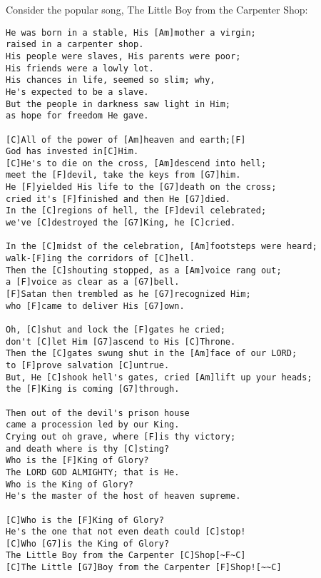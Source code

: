 Consider the popular song, The Little Boy from the Carpenter Shop:

\begin{verbatim}
He was born in a stable, His [Am]mother a virgin; 
raised in a carpenter shop.
His people were slaves, His parents were poor; 
His friends were a lowly lot.
His chances in life, seemed so slim; why, 
He's expected to be a slave.
But the people in darkness saw light in Him; 
as hope for freedom He gave.

[C]All of the power of [Am]heaven and earth;[F] 
God has invested in[C]Him.
[C]He's to die on the cross, [Am]descend into hell; 
meet the [F]devil, take the keys from [G7]him.
He [F]yielded His life to the [G7]death on the cross; 
cried it's [F]finished and then He [G7]died.
In the [C]regions of hell, the [F]devil celebrated; 
we've [C]destroyed the [G7]King, he [C]cried.

In the [C]midst of the celebration, [Am]footsteps were heard; 
walk-[F]ing the corridors of [C]hell.
Then the [C]shouting stopped, as a [Am]voice rang out; 
a [F]voice as clear as a [G7]bell.
[F]Satan then trembled as he [G7]recognized Him; 
who [F]came to deliver His [G7]own.

Oh, [C]shut and lock the [F]gates he cried; 
don't [C]let Him [G7]ascend to His [C]Throne.
Then the [C]gates swung shut in the [Am]face of our LORD; 
to [F]prove salvation [C]untrue.
But, He [C]shook hell's gates, cried [Am]lift up your heads; 
the [F]King is coming [G7]through.

Then out of the devil's prison house 
came a procession led by our King.
Crying out oh grave, where [F]is thy victory; 
and death where is thy [C]sting?
Who is the [F]King of Glory? 
The LORD GOD ALMIGHTY; that is He.
Who is the King of Glory? 
He's the master of the host of heaven supreme.

[C]Who is the [F]King of Glory? 
He's the one that not even death could [C]stop!
[C]Who [G7]is the King of Glory? 
The Little Boy from the Carpenter [C]Shop[~F~C]
[C]The Little [G7]Boy from the Carpenter [F]Shop![~~C]
\end{verbatim}